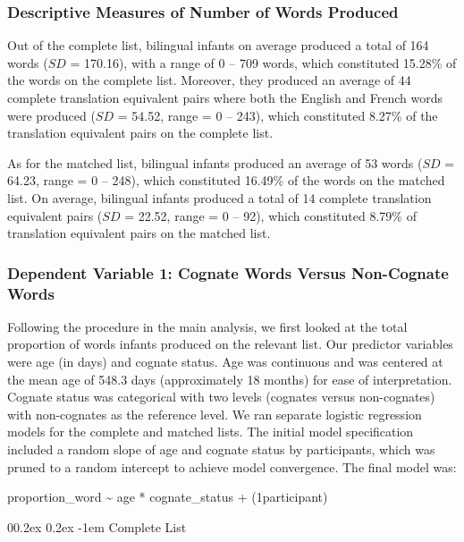 \documentclass[
  ,man,floatsintext]{apa6}
\makeatletter
\let\oldparagraph\paragraph
\renewcommand{\paragraph}[1]{\oldparagraph{#1}\mbox{}}
\renewcommand{\paragraph}{\@startsection{paragraph}{4}{\parindent}%
  {0\baselineskip \@plus 0.2ex \@minus 0.2ex}%
  {-1em}%
  {\normalfont\normalsize\bfseries\itshape\typesectitle}}
\makeatother
\begin{document}
\hypertarget{descriptive-measures-of-number-of-words-produced}{%
\subsubsection{Descriptive Measures of Number of Words Produced}\label{descriptive-measures-of-number-of-words-produced}}

Out of the complete list, bilingual infants on average produced a total of 164 words (\(SD\) = 170.16), with a range of 0 -- 709 words, which constituted 15.28\% of the words on the complete list. Moreover, they produced an average of 44 complete translation equivalent pairs where both the English and French words were produced (\(SD\) = 54.52, range = 0 -- 243), which constituted 8.27\% of the translation equivalent pairs on the complete list.

As for the matched list, bilingual infants produced an average of 53 words (\(SD\) = 64.23, range = 0 -- 248), which constituted 16.49\% of the words on the matched list. On average, bilingual infants produced a total of 14 complete translation equivalent pairs (\(SD\) = 22.52, range = 0 -- 92), which constituted 8.79\% of translation equivalent pairs on the matched list.

\hypertarget{dependent-variable-1-cognate-words-versus-non-cognate-words}{%
\subsubsection{Dependent Variable 1: Cognate Words Versus Non-Cognate Words}\label{dependent-variable-1-cognate-words-versus-non-cognate-words}}

Following the procedure in the main analysis, we first looked at the total proportion of words infants produced on the relevant list. Our predictor variables were age (in days) and cognate status. Age was continuous and was centered at the mean age of 548.3 days (approximately 18 months) for ease of interpretation. Cognate status was categorical with two levels (cognates versus non-cognates) with non-cognates as the reference level. We ran separate logistic regression models for the complete and matched lists. The initial model specification included a random slope of age and cognate status by participants, which was pruned to a random intercept to achieve model convergence. The final model was:

proportion\_word \textasciitilde{} age * cognate\_status + (1\textbar participant)

\hypertarget{complete-list}{%
\paragraph{Complete List}\label{complete-list}}
\end{document}
